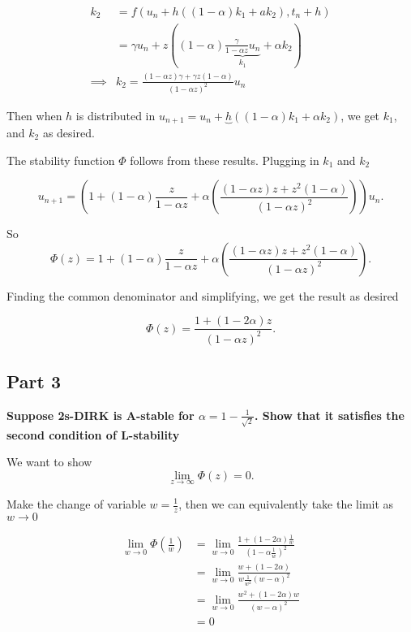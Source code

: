 \documentclass{article}
\begin{document}
\begin{align*}
  k_2 &= f(u_n + h \left((1- \alpha) k_1 + a k_2\right), t_n + h) \\
      &= \gamma u_n + z \left((1- \alpha)\underbrace{\frac{ \gamma}{1- \alpha
      z }u_n}_{k_1} + \alpha k_2\right) \\
  \implies &\boxed{k_2 = \frac{(1- \alpha z) \gamma + \gamma z (1- \alpha)}{(1-
  \alpha z)^{2}} u_n}
\end{align*}

\par Then when $h$ is distributed in $u_{n+1} = u_{n} + \underbrace{h} ((1-
  \alpha)k_1 + \alpha k_2)$, we get $k_1$, and $k_2$ as desired.

  The stability function $\Phi$ follows from these results. Plugging in $k_1$
  and $k_2$
  
  \[
    u_{n+1} = \left(1 + (1- \alpha) \frac{z}{1- \alpha z } + \alpha \left(
    \frac{ (1- \alpha z)z + z^{2}(1- \alpha) }{(1- \alpha z)^{2}}
\right)\right) u_n
  .\] 

  So 
  \[
  \Phi(z) = 1 + (1- \alpha) \frac{z}{1- \alpha z } + \alpha \left(
    \frac{ (1- \alpha z)z + z^{2}(1- \alpha) }{(1- \alpha z)^{2}}
\right)
  .\] 

  \par Finding the common denominator and simplifying, we get the result as desired

  \[
    \boxed{\Phi(z) = \frac{ 1 + (1-2 \alpha)z }{(1- \alpha z)^{2}}}
  .\] 
\subsection{Part 3}%
\label{sub:part_3}

\par \textbf{Suppose 2s-DIRK is A-stable for $ \alpha
= 1 - \frac{1}{\sqrt{2}}$. Show that it satisfies the second condition of
L-stability} 

We want to show 
\[
  \lim_{z \to \infty} \Phi (z) = 0
.\] 

Make the change of variable $w = \frac{1}{z}$, then we can equivalently take
the limit as $w \to 0$

 \begin{align*}
   \lim_{w \to 0} \Phi(\frac{1}{w}) &= \lim_{w \to 0} \frac{ 1 + (1-2 \alpha) \frac{1}{w}
   }{(1 - \alpha \frac{1}{w})^{2}} \\
   &= \lim_{w \to 0} \frac{ w + (1-2 \alpha) }{w \frac{1}{w^{2}}(w- \alpha)^{2}} \\
   &= \lim_{w \to 0} \frac{ w^{2} + (1- 2 \alpha) w }{(w- \alpha)^{2}} \\
   &= 0
\end{align*}
\end{document}
